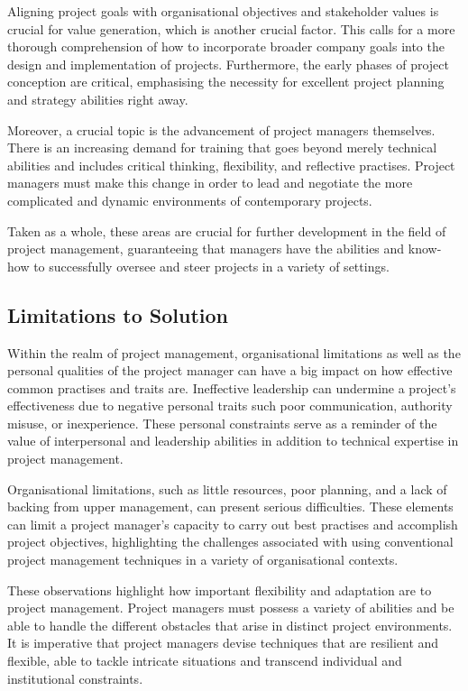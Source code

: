 \documentclass{article}
\begin{document}
Aligning project goals with organisational objectives and stakeholder values is crucial for value generation, which is another crucial factor. This calls for a more thorough comprehension of how to incorporate broader company goals into the design and implementation of projects. Furthermore, the early phases of project conception are critical, emphasising the necessity for excellent project planning and strategy abilities right away.

Moreover, a crucial topic is the advancement of project managers themselves. There is an increasing demand for training that goes beyond merely technical abilities and includes critical thinking, flexibility, and reflective practises. Project managers must make this change in order to lead and negotiate the more complicated and dynamic environments of contemporary projects.

Taken as a whole, these areas are crucial for further development in the field of project management, guaranteeing that managers have the abilities and know-how to successfully oversee and steer projects in a variety of settings.\cite{winter2006directions}


\subsection{Limitations to Solution}


Within the realm of project management, organisational limitations as well as the personal qualities of the project manager can have a big impact on how effective common practises and traits are. Ineffective leadership can undermine a project's effectiveness due to negative personal traits such poor communication, authority misuse, or inexperience. These personal constraints serve as a reminder of the value of interpersonal and leadership abilities in addition to technical expertise in project management.

Organisational limitations, such as little resources, poor planning, and a lack of backing from upper management, can present serious difficulties. These elements can limit a project manager's capacity to carry out best practises and accomplish project objectives, highlighting the challenges associated with using conventional project management techniques in a variety of organisational contexts.

These observations highlight how important flexibility and adaptation are to project management. Project managers must possess a variety of abilities and be able to handle the different obstacles that arise in distinct project environments. It is imperative that project managers devise techniques that are resilient and flexible, able to tackle intricate situations and transcend individual and institutional constraints.\cite{toor2009ineffective}
\end{document}
